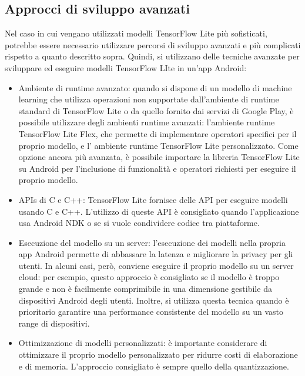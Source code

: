 \subsection{Approcci di sviluppo avanzati}
Nel caso in cui vengano utilizzati modelli TensorFlow Lite più sofisticati, potrebbe essere necessario utilizzare percorsi di sviluppo avanzati e più complicati rispetto a quanto descritto sopra. Quindi,
si utilizzano delle tecniche avanzate per sviluppare ed eseguire modelli TensorFlow LIte in un’app Android:
\begin{itemize}
    \item Ambiente di runtime avanzato: quando si dispone di un modello di machine learning che utilizza operazioni non supportate dall’ambiente di runtime standard di TensorFlow Lite o da quello fornito dai servizi di Google Play,
    è possibile utilizzare degli ambienti runtime avanzati: l’ambiente runtime TensorFlow Lite Flex, che permette di implementare operatori specifici per il proprio modello, e l’ ambiente runtime TensorFlow Lite personalizzato.
    Come opzione ancora più avanzata, è possibile importare la libreria TensorFlow Lite su Android per l’inclusione di funzionalità e operatori richiesti per eseguire il proprio modello.
    \item APIs di C e C++: TensorFlow Lite fornisce delle API per eseguire modelli usando C e C++. L’utilizzo di queste API è consigliato quando l’applicazione usa Android NDK o se si vuole condividere codice tra piattaforme.
    \item Esecuzione del modello su un server: l’esecuzione dei modelli nella propria app Android permette di abbassare la latenza e migliorare la privacy per gli utenti. In alcuni casi, però, conviene eseguire il proprio modello
    su un server cloud: per esempio, questo approccio è consigliato se il modello è troppo grande e non è facilmente comprimibile in una dimensione gestibile da dispositivi Android degli utenti. Inoltre, si utilizza questa tecnica
    quando è prioritario garantire una performance consistente del modello su un vasto range di dispositivi.
    \item Ottimizzazione di modelli personalizzati: è importante considerare di ottimizzare il proprio modello personalizzato per ridurre costi di elaborazione e di memoria. L’approccio consigliato è sempre quello della quantizzazione. 
\end{itemize}